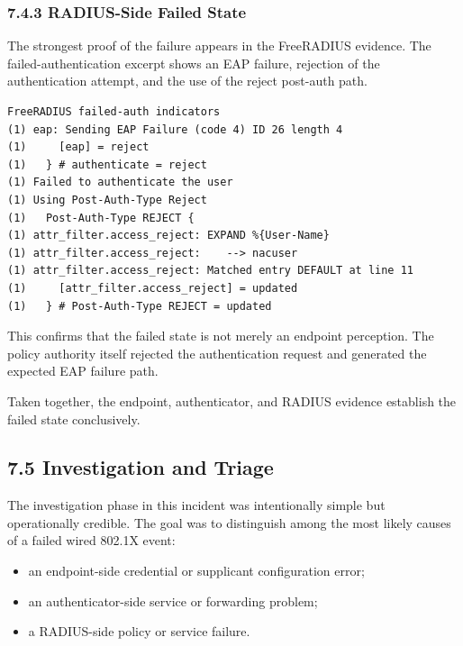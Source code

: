 \documentclass[11pt]{article}
\begin{document}
\subsubsection{7.4.3 RADIUS-Side Failed State}
\label{sec:radius-side-failed-state}

The strongest proof of the failure appears in the FreeRADIUS evidence. The failed-authentication excerpt shows an EAP failure, rejection of the authentication attempt, and the use of the reject post-auth path.

\begin{verbatim}
FreeRADIUS failed-auth indicators
(1) eap: Sending EAP Failure (code 4) ID 26 length 4
(1)     [eap] = reject
(1)   } # authenticate = reject
(1) Failed to authenticate the user
(1) Using Post-Auth-Type Reject
(1)   Post-Auth-Type REJECT {
(1) attr_filter.access_reject: EXPAND %{User-Name}
(1) attr_filter.access_reject:    --> nacuser
(1) attr_filter.access_reject: Matched entry DEFAULT at line 11
(1)     [attr_filter.access_reject] = updated
(1)   } # Post-Auth-Type REJECT = updated
\end{verbatim}

This confirms that the failed state is not merely an endpoint perception. The policy authority itself rejected the authentication request and generated the expected EAP failure path.

Taken together, the endpoint, authenticator, and RADIUS evidence establish the failed state conclusively.


\subsection{7.5 Investigation and Triage}
\label{sec:investigation-and-triage}

The investigation phase in this incident was intentionally simple but operationally credible. The goal was to distinguish among the most likely causes of a failed wired 802.1X event:

\begin{itemize}
    \item an endpoint-side credential or supplicant configuration error;
    \item an authenticator-side service or forwarding problem;
    \item a RADIUS-side policy or service failure.
\end{itemize}
\end{document}
